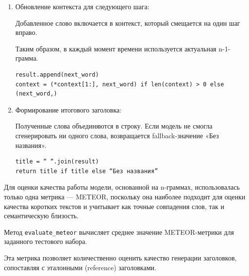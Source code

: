 \documentclass[coursework]{SCWorks}
\begin{document}
\begin{enumerate}
        Следующее слово выбирается случайно, пропорционально вероятностям.

        Используется стандартная выборка с весами.

        \begin{verbatim}
words = list(word_probs.keys())
probs = list(word_probs.values())
next_word = random.choices(words, weights=probs)[0]
        \end{verbatim}

        Если модель сгенерировала маркеры </s> или <title>, процесс завершатся — это признаки конца последовательности.

        \begin{verbatim}
if next_word in {self.end_token, self.title_token}:
    break
        \end{verbatim}

        \item Обновление контекста для следующего шага:

        Добавленное слово включается в контекст, который смещается на один шаг вправо.

        Таким образом, в каждый момент времени используется актуальная n-1-грамма.

        \begin{verbatim}
result.append(next_word)
context = (*context[1:], next_word) if len(context) > 0 else (next_word,)
        \end{verbatim}
        \item Формирование итогового заголовка:

        Полученные слова объединяются в строку.
        Если модель не смогла сгенерировать ни одного слова, возвращается fallback-значение «Без названия».

        \begin{verbatim}
title = “ “.join(result)
return title if title else “Без названия”
        \end{verbatim}
    \end{enumerate}


    Для оценки качества работы модели, основанной на n-граммах, использовалась только одна метрика — METEOR,
    поскольку она наиболее подходит для оценки качества коротких текстов и учитывает как точные совпадения слов,
    так и семантическую близость.

    Метод \texttt{evaluate\_meteor} вычисляет среднее значение METEOR-метрики для заданного тестового набора.

    Эта метрика позволяет количественно оценить качество генерации заголовков, сопоставляя с эталонными (reference) заголовками.
\end{document}
